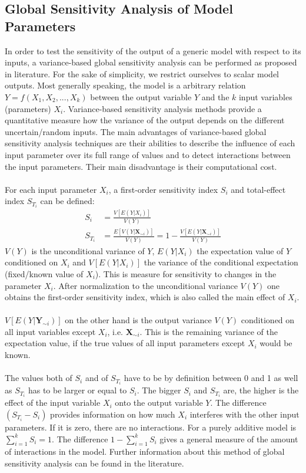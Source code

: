 \documentclass[11pt]{article}
\begin{document}
\subsection{Global Sensitivity Analysis of Model Parameters}
In order to test the sensitivity of the output of a generic model with respect to its inputs, a variance-based global sensitivity analysis can be performed as proposed in literature. For the sake of simplicity, we restrict ourselves to scalar model outputs. Most generally speaking, the model is a arbitrary relation $Y = f(X_1,X_2,...,X_k)$ between the output variable $Y$ and the $k$ input variables (parameters) $X_i$. Variance-based sensitivity analysis methods provide a quantitative measure how the variance of the output depends on the different uncertain/random inputs. The main advantages of variance-based global sensitivity analysis techniques are their abilities to describe the influence of each input parameter over its full range of values and to detect interactions between the input parameters. Their main disadvantage is their computational cost.\\
\\
For each input parameter $X_i$, a first-order sensitivity index $S_i$ and total-effect index $S_{T_i}$ can be defined:
\begin{align}
S_i &= \frac{V[E(Y|X_i)]}{V(Y)}\\
S_{T_i} &= \frac{E[V(Y|\textbf{X}_{\sim i})]}{V(Y)} = 1 - \frac{V[E(Y|\textbf{X}_{\sim i})]}{V(Y)}
\end{align}
$V(Y)$ is the unconditional variance of $Y$, $E(Y|X_i)$ the expectation value of $Y$ conditioned on $X_i$ and $V[E(Y|X_i)]$ the variance of the conditional expectation (fixed/known value of $X_i$). This is measure for sensitivity to changes in the parameter $X_i$. After normalization to the unconditional variance $V(Y)$ one obtains the first-order sensitivity index, which is also called the main effect of $X_i$.\\
\\
$V[E(Y|\textbf{Y}_{\sim i})]$ on the other hand is the output variance $V(Y)$ conditioned on all input variables except $X_i$, i.e. $\textbf{X}_{\sim i}$. This is the remaining variance of the expectation value, if the true values of all input parameters except $X_i$ would be known.\\
\\
The values both of $S_i$ and of $S_{T_i}$ have to be by definition between 0 and 1 as well as  $S_{T_i}$ has to be larger or equal to $S_i$. The bigger $S_i$ and $S_{T_i}$ are, the higher is the effect of the input variable $X_i$ onto the output variable $Y$. The difference $(S_{T_i} - S_i)$ provides information on how much $X_i$ interferes with the other input parameters. If it is zero, there are no interactions. For a purely additive model is $\sum_{i=1}^k S_i = 1$. The difference $1 - \sum_{i=1}^k S_i$ gives a general measure of the amount of interactions in the model. Further information about this method of global sensitivity analysis can be found in the literature.
\end{document}
